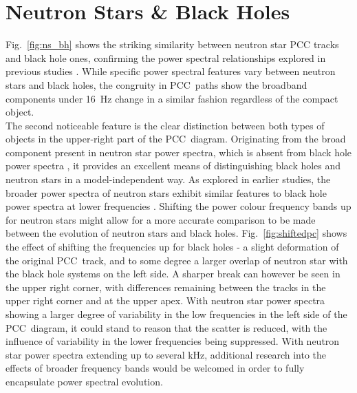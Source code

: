 \section{Neutron Stars \& Black Holes}
\label{sec:dis_nsbh}
Fig.~\ref{fig:ns_bh} shows the striking similarity between neutron star \ac{PCC} tracks and black hole ones, confirming the power spectral relationships explored in previous studies \citep[e.g.][]{wijnands1999broadband,sunyaev2000fourier,klein2008identification}. While specific power spectral features vary between neutron stars and black holes, the congruity in \ac{PCC}~paths show the broadband components under 16~Hz change in a similar fashion regardless of the compact object.\\

The second noticeable feature is the clear distinction between both types of objects in the upper-right part of the \ac{PCC}~diagram. Originating from the broad component present in neutron star power spectra, which is absent from black hole power spectra \citep[see][]{sunyaev2000fourier}, it provides an excellent means of distinguishing black holes and neutron stars in a model-independent way. As explored in earlier studies, the broader power spectra of neutron stars exhibit similar features to black hole power spectra at lower frequencies \citep{klein2008identification}. Shifting the power colour frequency bands up for neutron stars might allow for a more accurate comparison to be made between the evolution of neutron stars and black holes. Fig.~\ref{fig:shiftedpc} shows the effect of shifting the frequencies up for black holes - a slight deformation of the original \ac{PCC}~track, and to some degree a larger overlap of neutron star with the black hole systems on the left side. A sharper break can however be seen in the upper right corner, with differences remaining between the tracks in the upper right corner and at the upper apex. With neutron star power spectra showing a larger degree of variability in the low frequencies in the left side of the \ac{PCC}~diagram, it could stand to reason that the scatter is reduced, with the influence of variability in the lower frequencies being suppressed. With neutron star power spectra extending up to several kHz, additional research into the effects of broader frequency bands would be welcomed in order to fully encapsulate power spectral evolution.\\

